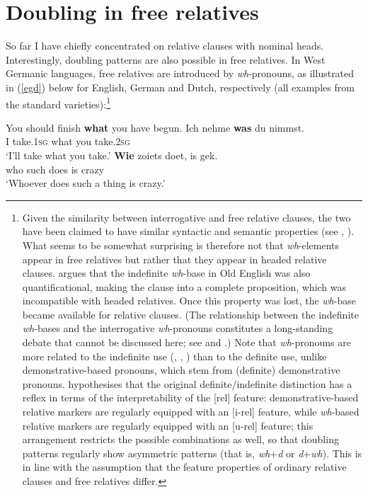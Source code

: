 \section{Doubling in free relatives} \label{sec:4doublingfree}
So far I have chiefly concentrated on relative clauses with nominal heads. Interestingly, doubling patterns are also possible in free relatives. In West Germanic languages, free relatives are introduced by \textit{wh}-pronouns, as illustrated in (\ref{egd}) below for English, German and Dutch, respectively (all examples from the standard varieties):\footnote{Given the similarity between interrogative and free relative clauses, the two have been claimed to have similar syntactic and semantic properties (see \citealt{caponigro2003diss}, \citealt{polettosanfelici2019}). What seems to be somewhat surprising is therefore not that \textit{wh}-elements appear in free relatives but rather that they appear in headed relative clauses. \citet{watanabe2009} argues that the indefinite \textit{wh}-base in Old English was also quantificational, making the clause into a complete proposition, which was incompatible with headed relatives. Once this property was lost, the \textit{wh}-base became available for relative clauses. (The relationship between the indefinite \textit{wh}-bases and the interrogative \textit{wh}-pronouns constitutes a long-standing debate that cannot be discussed here; see \citealt[348]{brugman1911} and \citealt{gonda1954}.) Note that \textit{wh}-pronouns are more related to the indefinite use (\citealt{paul1920band4}, \citealt{gonda1954}, \citealt{gisbornetruswell2017}) than to the definite use, unlike demonstrative-based pronouns, which stem from (definite) demonstrative pronouns. \citealt{bacskaiatkaritoappearfdsl} hypothesises that the original definite/indefinite distinction has a reflex in terms of the interpretability of the [rel] feature: demonstrative-based relative markers are regularly equipped with an [i-rel] feature, while \textit{wh}-based relative markers are regularly equipped with an [u-rel] feature; this arrangement restricts the possible combinations as well, so that doubling patterns regularly show asymmetric patterns (that is, \textit{wh}+\textit{d} or \textit{d}+\textit{wh}). This is in line with the assumption that the feature properties of ordinary relative clauses and free relatives differ.}

\ea \label{egd}
\ea You should finish \textbf{what} you have begun. \label{what}
\ex \gll Ich nehme \textbf{was} du nimmst.\\
I take.\textsc{1sg} what you take.\textsc{2sg}\\
\glt `I'll take what you take.'
\ex \gll \textbf{Wie} zoiets doet, is gek.\\
who such does is crazy\\
\glt `Whoever does such a thing is crazy.'
\z
\z

